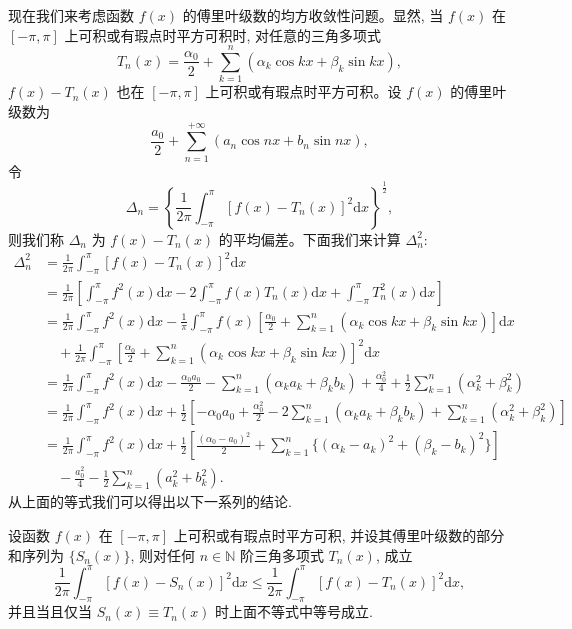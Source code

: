 现在我们来考虑函数 $f(x)$ 的傅里叶级数的均方收敛性问题。显然, 当 $f(x)$ 在 $[-\pi,\pi]$ 上可积或有瑕点时平方可积时, 对任意的三角多项式
\[
  T_n(x)=\frac{\alpha_0}{2}+\sum_{k=1}^n(\alpha_k\cos kx+\beta_k\sin kx),
\]
$f(x)-T_n(x)$ 也在 $[-\pi,\pi]$ 上可积或有瑕点时平方可积。设 $f(x)$ 的傅里叶级数为
\[
  \frac{a_0}{2}+\sum_{n=1}^{+\infty}(a_n\cos nx+b_n\sin nx),
\]
令
\[
  \Delta_n=\left\{\frac1{2\pi}\int_{-\pi}^{\pi}[f(x)-T_n(x)]^2\mathrm dx\right\}^{\frac12},
\]
则我们称 $\Delta_n$ 为 $f(x)-T_n(x)$ 的平均偏差。下面我们来计算 $\Delta_n^2$:
\[
\begin{aligned}
  \Delta_n^2
  &=\frac1{2\pi}\int_{-\pi}^{\pi}[f(x)-T_n(x)]^2\mathrm dx\\
  &=\frac1{2\pi}\left[
    \int_{-\pi}^{\pi}f^2(x)\mathrm dx
    -2\int_{-\pi}^{\pi}f(x)T_n(x)\mathrm dx
    +\int_{-\pi}^{\pi}T_n^2(x)\mathrm dx
  \right]\\
  &=\frac1{2\pi}\int_{-\pi}^{\pi}f^2(x)\mathrm dx
    -\frac1\pi\int_{-\pi}^{\pi}f(x)
    \left[\frac{\alpha_0}{2}+\sum_{k=1}^n(\alpha_k\cos kx+\beta_k\sin kx)\right]\mathrm dx\\
  &\quad+\frac1{2\pi}\int_{-\pi}^{\pi}
    \left[\frac{\alpha_0}{2}+\sum_{k=1}^n(\alpha_k\cos kx+\beta_k\sin kx)\right]^2\mathrm dx\\
  &=\frac1{2\pi}\int_{-\pi}^{\pi}f^2(x)\mathrm dx
    -\frac{\alpha_0a_0}{2}
    -\sum_{k=1}^n(\alpha_ka_k+\beta_kb_k)
    +\frac{\alpha_0^2}{4}
    +\frac12\sum_{k=1}^n(\alpha_k^2+\beta_k^2)\\
  &=\frac1{2\pi}\int_{-\pi}^{\pi}f^2(x)\mathrm dx
    +\frac12\left[
      -\alpha_0a_0+\frac{\alpha_0^2}{2}
      -2\sum_{k=1}^n(\alpha_ka_k+\beta_kb_k)
      +\sum_{k=1}^n(\alpha_k^2+\beta_k^2)
    \right]\\
  &=\frac1{2\pi}\int_{-\pi}^{\pi}f^2(x)\mathrm dx
    +\frac12\left[
      \frac{(\alpha_0-a_0)^2}{2}
      +\sum_{k=1}^n\{(\alpha_k-a_k)^2+(\beta_k-b_k)^2\}
    \right]\\
  &\quad-\frac{a_0^2}{4}
    -\frac12\sum_{k=1}^n(a_k^2+b_k^2).
\end{aligned}
\]
从上面的等式我们可以得出以下一系列的结论.

\begin{theorem}[{傅里叶级数最佳逼近}]\label{theorem:ma-12-3-2}
设函数 $f(x)$ 在 $[-\pi,\pi]$ 上可积或有瑕点时平方可积, 并设其傅里叶级数的部分和序列为 $\{S_n(x)\}$, 则对任何 $n\in\mathbb N$ 阶三角多项式 $T_n(x)$, 成立
\[
  \frac1{2\pi}\int_{-\pi}^{\pi}[f(x)-S_n(x)]^2\mathrm dx
  \leqslant
  \frac1{2\pi}\int_{-\pi}^{\pi}[f(x)-T_n(x)]^2\mathrm dx,
\]
并且当且仅当 $S_n(x)\equiv T_n(x)$ 时上面不等式中等号成立.
\end{theorem}


